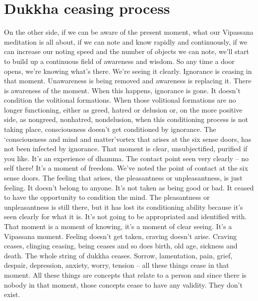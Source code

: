 \documentclass[letterpaper,10pt,english]{sphinxmanual}
\begin{document}
\section{Dukkha ceasing process}
\label{\detokenize{6-b:dukkha-ceasing-process}}
\sphinxAtStartPar
On the other side, if we can be aware of the present moment, what our
Vipassana meditation is all about, if we can note and know rapidly and continuously, if we can increase our noting speed and the number of objects we
  can note, we’ll start to build up a continuous field of awareness and wisdom.
So  any  time  a  door  opens,  we’re  knowing  what’s  there.  We’re  seeing  it
clearly. Ignorance is ceasing in that moment. Unawareness is being removed
and awareness is replacing it. There is awareness of the moment. When this
happens, ignorance is gone. It doesn’t condition the volitional formations.
When those volitional formations are no longer functioning, either as greed,
hatred or delusion or, on the more positive side, as non\sphinxhyphen{}greed, non\sphinxhyphen{}hatred,
non\sphinxhyphen{}delusion, when this conditioning process is not taking place, consciousness  doesn’t  get  conditioned  by  ignorance.  The  ‘consciousness  and  mind
and matter’\sphinxhyphen{}vortex that arises at the six sense doors, has not been infected by
ignorance. That moment is clear, unsubjectified, purified if you like. It’s an
experience of dhamma. The contact point seen very clearly – no self there!
It’s a moment of freedom. We’ve noted the point of contact at the six sense
doors.  The  feeling  that  arises,  the  pleasantness  or  unpleasantness,  is  just
feeling. It doesn’t belong to anyone. It’s not taken as being good or bad. It
ceased to have the opportunity to condition the mind. The pleasantness or
unpleasantness is still there, but it has lost its conditioning ability because
it’s seen clearly for what it is. It’s not going to be appropriated and identified
with. That moment is a moment of knowing, it’s a moment of clear seeing.
It’s  a Vipassana  moment.  Feeling  doesn’t  get  taken,  craving  doesn’t  arise.
Craving ceases, clinging ceasing, being ceases and so does birth, old age,
sickness and death. The whole string of dukkha ceases. Sorrow, lamentation,
pain,  grief,  despair,  depression,  anxiety,  worry,  tension  –  all  these  things
cease in that moment. All these things are concepts that relate to a person
and since there is nobody in that moment, those concepts cease to have any
validity. They don’t exist.
\end{document}
